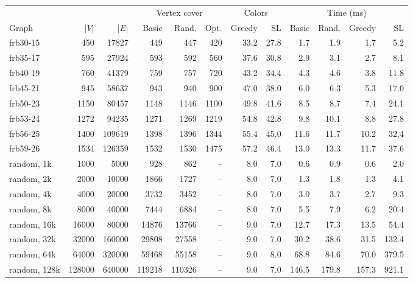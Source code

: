 \begin{tabular}{lrrrrrrrrrrr}
\toprule
 & & & \multicolumn{3}{c}{Vertex cover} & \multicolumn{2}{c}{Colors} & \multicolumn{4}{c}{Time (ms)} \\
\cmidrule(lr){4-6} \cmidrule(lr){7-8} \cmidrule(lr){9-12}
Graph & $|V|$ & $|E|$ & Basic & Rand. & Opt. & Greedy & SL & Basic & Rand. & Greedy & SL \\
\midrule
frb30-15 & 450 & 17827 & 449 & 447 & 420 & 33.2 & 27.8 & 1.7 & 1.9 & 1.7 & 5.2 \\
frb35-17 & 595 & 27924 & 593 & 592 & 560 & 37.6 & 30.8 & 2.9 & 3.1 & 2.7 & 8.1 \\
frb40-19 & 760 & 41379 & 759 & 757 & 720 & 43.2 & 34.4 & 4.3 & 4.6 & 3.8 & 11.8 \\
frb45-21 & 945 & 58637 & 943 & 940 & 900 & 47.0 & 38.0 & 6.0 & 6.3 & 5.3 & 17.0 \\
frb50-23 & 1150 & 80457 & 1148 & 1146 & 1100 & 49.8 & 41.6 & 8.5 & 8.7 & 7.4 & 24.1 \\
frb53-24 & 1272 & 94235 & 1271 & 1269 & 1219 & 54.8 & 42.8 & 9.8 & 10.1 & 8.8 & 27.8 \\
frb56-25 & 1400 & 109619 & 1398 & 1396 & 1344 & 55.4 & 45.0 & 11.6 & 11.7 & 10.2 & 32.4 \\
frb59-26 & 1534 & 126359 & 1532 & 1530 & 1475 & 57.2 & 46.4 & 13.0 & 13.3 & 11.7 & 37.6 \\
\midrule
random, 1k & 1000 & 5000 & 928 & 862 & -- & 8.0 & 7.0 & 0.6 & 0.9 & 0.6 & 2.0 \\
random, 2k & 2000 & 10000 & 1866 & 1727 & -- & 8.0 & 7.0 & 1.3 & 1.8 & 1.3 & 4.1 \\
random, 4k & 4000 & 20000 & 3732 & 3452 & -- & 8.0 & 7.0 & 3.0 & 3.7 & 2.7 & 9.3 \\
random, 8k & 8000 & 40000 & 7444 & 6884 & -- & 8.0 & 7.0 & 5.5 & 7.9 & 6.2 & 20.4 \\
random, 16k & 16000 & 80000 & 14876 & 13766 & -- & 9.0 & 7.0 & 12.7 & 17.3 & 13.5 & 54.4 \\
random, 32k & 32000 & 160000 & 29808 & 27558 & -- & 9.0 & 7.0 & 30.2 & 38.6 & 31.5 & 132.4 \\
random, 64k & 64000 & 320000 & 59468 & 55158 & -- & 9.0 & 8.0 & 68.8 & 84.6 & 70.0 & 379.5 \\
random, 128k & 128000 & 640000 & 119218 & 110326 & -- & 9.0 & 7.0 & 146.5 & 179.8 & 157.3 & 921.1 \\
\bottomrule
\end{tabular}
